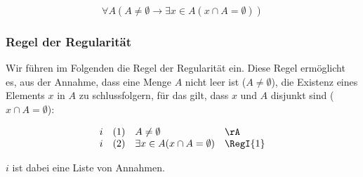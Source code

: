 \documentclass{book}
\theoremstyle{plain}
\theoremstyle{remark}
\theoremstyle{definition}
\begin{document}
\label{FaALpANotEqualsEmptysetToExxInALpxcaAEqualsEmptysetRpRp}
\[
\forall A (A \neq \emptyset \rightarrow \exists x\in A (x \cap A = \emptyset))
\]

\subsubsection{Regel der Regularität}
\label{rule:RegI}

Wir führen im Folgenden die Regel der Regularität ein. Diese Regel ermöglicht es, aus der Annahme, dass eine Menge \(A\) nicht leer ist (\(A \neq \emptyset\)), die Existenz eines Elements \(x\) in \(A\) zu schlussfolgern, für das gilt, dass \(x\) und \(A\) disjunkt sind (\(x \cap A = \emptyset\)):

\[
\begin{array}{llll}
	i & (1) & A \neq \emptyset & \rA \\
	i & (2) & \exists x \in A (x \cap A = \emptyset) & \RegI{1} \\
\end{array}
\]

\(i\) ist dabei eine Liste von Annahmen.
\end{document}
